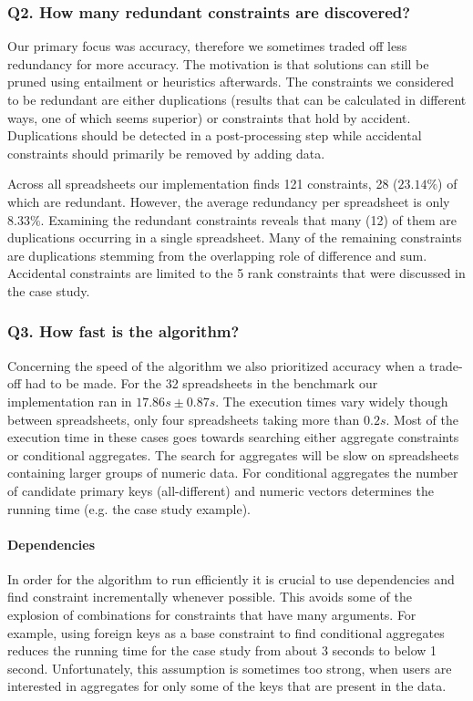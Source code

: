 \documentclass{ecai}
\begin{document}
\subsubsection*{Q2. How many redundant constraints are discovered?}
Our primary focus was accuracy, therefore we sometimes traded off less redundancy for more accuracy.
The motivation is that solutions can still be pruned using entailment or heuristics afterwards.
The constraints we considered to be redundant are either duplications (results that can be calculated in different ways, one of which seems superior) or constraints that hold by accident.
Duplications should be detected in a post-processing step while accidental constraints should primarily be removed by adding data.

Across all spreadsheets our implementation finds 121 constraints, 28 ($23.14\%$) of which are redundant.
However, the average redundancy per spreadsheet is only $8.33\%$.
Examining the redundant constraints reveals that many (12) of them are duplications occurring in a single spreadsheet.
Many of the remaining constraints are duplications stemming from the overlapping role of difference and sum.
Accidental constraints are limited to the 5 rank constraints that were discussed in the case study.

\subsubsection*{Q3. How fast is the algorithm?}
Concerning the speed of the algorithm we also prioritized accuracy when a trade-off had to be made.
For the 32 spreadsheets in the benchmark our implementation ran in $17.86s \pm 0.87s$.
The execution times vary widely though between spreadsheets, only four spreadsheets taking more than $0.2s$.
Most of the execution time in these cases goes towards searching either aggregate constraints or conditional aggregates.
The search for aggregates will be slow on spreadsheets containing larger groups of numeric data.
For conditional aggregates the number of candidate primary keys (all-different) and numeric vectors determines the running time (e.g. the case study example).

\paragraph{Dependencies}
In order for the algorithm to run efficiently it is crucial to use dependencies and find constraint incrementally whenever possible.
This avoids some of the explosion of combinations for constraints that have many arguments.
For example, using foreign keys as a base constraint to find conditional aggregates reduces the running time for the case study from about 3 seconds to below 1 second.
Unfortunately, this assumption is sometimes too strong, when users are interested in aggregates for only some of the keys that are present in the data.
\end{document}
